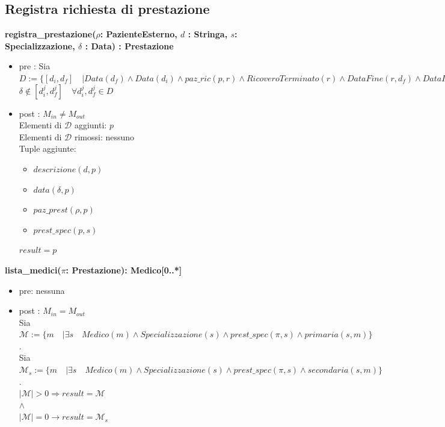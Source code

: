 \documentclass[12pt, letterpaper]{article}
\begin{document}
\subsection{Registra richiesta di prestazione}
    \textbf{registra\_prestazione($\rho$: PazienteEsterno, $d$ : Stringa, $s$: Specializzazione, $\delta$ : Data) : Prestazione}
    \begin{itemize}
        \item pre : Sia $D :=\{ [d_i,d_f] \quad| Data(d_f)\land Data(d_i) \land paz\_ric(p,r)\land RicoveroTerminato(r) \land DataFine(r,d_f) \land DataInizio(r,d_i)\}$\\
        $\delta \notin [d_i^j,d_f^j] \quad \forall d_i^j, d_f^j \in D$
        \item post : $M_{in} \neq M_{out}$\\
        Elementi di $\mathcal{D}$ aggiunti: $p$\\
        Elementi di $\mathcal{D}$ rimossi: nessuno \\
        Tuple aggiunte:
        \begin{itemize}
            \item $descrizione(d,p)$
            \item $data(\delta,p)$
            \item $paz\_prest(\rho,p)$
            \item $prest\_spec(p,s)$
        \end{itemize}
        $result = p$
    \end{itemize}

 \textbf{lista\_medici($\pi$: Prestazione): Medico[0..*]}
    \begin{itemize}
        \item pre: nessuna
        \item post : $M_{in} = M_{out}$\\
        Sia $\mathcal{M} :=\{ m\quad | \exists s \quad Medico(m)\land Specializzazione(s)\land prest\_spec(\pi,s)\land primaria(s,m)\}$.\\
        Sia $\mathcal{M}_s := \{ m\quad | \exists s \quad Medico(m)\land Specializzazione(s)\land prest\_spec(\pi,s)\land secondaria(s,m)\}$.\\
        $|\mathcal{M}|> 0 \Rightarrow result = \mathcal{M}$ \\
        $\land$\\
        $|\mathcal{M}|=0 \rightarrow result = \mathcal{M}_s$
    \end{itemize}
\end{document}
